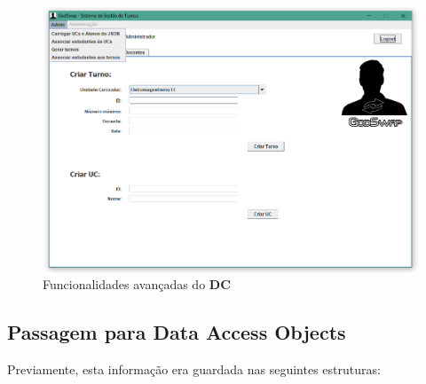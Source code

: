 \documentclass[a4paper]{article}
\begin{document}
\begin{figure}[H]
\centering
\includegraphics[width=13.5cm]{IfuncionalidadesADMIN}
\caption{Funcionalidades avançadas do \textbf{DC}}
\label{}
\end{figure}


\subsection{Passagem para Data Access Objects}

Previamente, esta informação era guardada nas seguintes estruturas:
\end{document}
